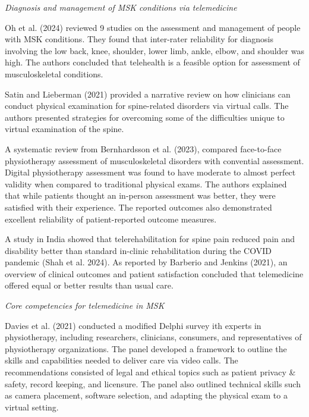 \documentclass[
  letterpaper,
]{article}
\begin{document}
\emph{Diagnosis and management of MSK conditions via telemedicine}

Oh et al. (2024) reviewed 9 studies on the assessment and management of
people with MSK conditions. They found that inter-rater reliability for
diagnosis involving the low back, knee, shoulder, lower limb, ankle,
elbow, and shoulder was high. The authors concluded that telehealth is a
feasible option for assessment of musculoskeletal conditions.

Satin and Lieberman (2021) provided a narrative review on how clinicians
can conduct physical examination for spine-related disorders via virtual
calls. The authors presented strategies for overcoming some of the
difficulties unique to virtual examination of the spine.

A systematic review from Bernhardsson et al. (2023), compared
face-to-face physiotherapy assessment of musculoskeletal disorders with
convential assessment. Digital physiotherapy assessment was found to
have moderate to almost perfect validity when compared to traditional
physical exams. The authors explained that while patients thought an
in-person assessment was better, they were satisfied with their
experience. The reported outcomes also demonstrated excellent
reliability of patient-reported outcome measures.

A study in India showed that telerehabilitation for spine pain reduced
pain and disability better than standard in-clinic rehabilitation during
the COVID pandemic (Shah et al. 2024). As reported by Barberio and
Jenkins (2021), an overview of clinical outcomes and patient
satisfaction concluded that telemedicine offered equal or better results
than usual care.

\emph{Core competencies for telemedicine in MSK}

Davies et al. (2021) conducted a modified Delphi survey ith experts in
physiotherapy, including researchers, clinicians, consumers, and
representatives of physiotherapy organizations. The panel developed a
framework to outline the skills and capabilities needed to deliver care
via video calls. The recommendations consisted of legal and ethical
topics such as patient privacy \& safety, record keeping, and licensure.
The panel also outlined technical skills such as camera placement,
software selection, and adapting the physical exam to a virtual setting.
\end{document}
